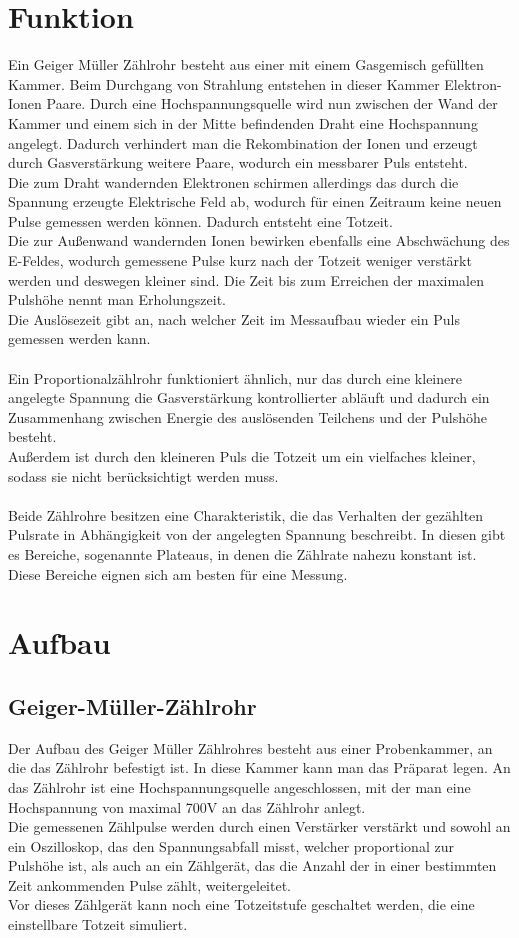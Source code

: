 \documentclass[12pt,a4paper]{article}
\begin{document}
\section{Funktion}
Ein Geiger Müller Zählrohr besteht aus einer mit einem Gasgemisch gefüllten Kammer. Beim Durchgang von Strahlung entstehen in dieser Kammer Elektron-Ionen Paare. Durch eine  Hochspannungsquelle wird nun zwischen der Wand der Kammer und einem sich in der Mitte befindenden Draht eine Hochspannung angelegt. Dadurch verhindert man die Rekombination der Ionen und erzeugt durch Gasverstärkung weitere Paare, wodurch ein messbarer Puls entsteht.\\
Die zum Draht wandernden Elektronen schirmen allerdings das durch die Spannung erzeugte Elektrische Feld ab, wodurch für einen Zeitraum keine neuen Pulse gemessen werden können. Dadurch entsteht eine Totzeit.\\
Die zur Außenwand wandernden Ionen bewirken ebenfalls eine Abschwächung des E-Feldes, wodurch gemessene Pulse kurz nach der Totzeit weniger verstärkt werden und deswegen kleiner sind. Die Zeit bis zum Erreichen der maximalen Pulshöhe nennt man Erholungszeit.\\
Die Auslösezeit gibt an, nach welcher Zeit im Messaufbau wieder ein Puls gemessen werden kann.\\
\\
Ein Proportionalzählrohr funktioniert ähnlich, nur das durch eine kleinere angelegte Spannung die Gasverstärkung kontrollierter abläuft und dadurch ein Zusammenhang zwischen Energie des auslösenden Teilchens und der Pulshöhe besteht.\\
Außerdem ist durch den kleineren Puls die Totzeit um ein vielfaches kleiner, sodass sie nicht berücksichtigt werden muss.\\
\\
Beide Zählrohre besitzen eine Charakteristik, die das Verhalten der gezählten Pulsrate in Abhängigkeit von der angelegten Spannung beschreibt. In diesen gibt es Bereiche, sogenannte Plateaus, in denen die Zählrate nahezu konstant ist. Diese Bereiche eignen sich am besten für eine Messung.

\section{Aufbau}
\subsection{Geiger-Müller-Zählrohr}
Der Aufbau des Geiger Müller Zählrohres besteht aus einer Probenkammer, an die das Zählrohr befestigt ist. In diese Kammer kann man das Präparat legen. An das Zählrohr ist eine Hochspannungsquelle angeschlossen, mit der man eine Hochspannung von maximal 700V an das Zählrohr anlegt.\\
Die gemessenen Zählpulse werden durch einen Verstärker verstärkt und sowohl an ein Oszilloskop, das den Spannungsabfall misst, welcher proportional zur Pulshöhe ist, als auch an ein Zählgerät, das die Anzahl der in einer bestimmten Zeit ankommenden Pulse zählt, weitergeleitet.\\
Vor dieses Zählgerät kann noch eine Totzeitstufe geschaltet werden, die eine einstellbare Totzeit simuliert.
\end{document}
